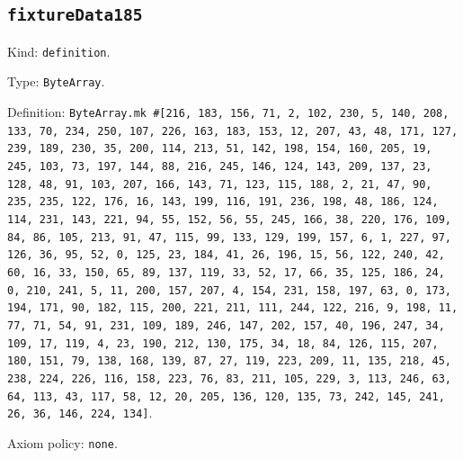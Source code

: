 \documentclass[11pt]{article}
\begin{document}
\subsection*{\texttt{fixtureData185}}
\noindent Kind: \texttt{definition}.\par
\noindent Type: \texttt{ByteArray}.\par
\noindent Definition: \texttt{ByteArray.mk \#[216, 183, 156, 71, 2, 102, 230, 5, 140, 208, 133, 70, 234, 250, 107, 226, 163, 183, 153, 12, 207, 43, 48, 171, 127, 239, 189, 230, 35, 200, 114, 213, 51, 142, 198, 154, 160, 205, 19, 245, 103, 73, 197, 144, 88, 216, 245, 146, 124, 143, 209, 137, 23, 128, 48, 91, 103, 207, 166, 143, 71, 123, 115, 188, 2, 21, 47, 90, 235, 235, 122, 176, 16, 143, 199, 116, 191, 236, 198, 48, 186, 124, 114, 231, 143, 221, 94, 55, 152, 56, 55, 245, 166, 38, 220, 176, 109, 84, 86, 105, 213, 91, 47, 115, 99, 133, 129, 199, 157, 6, 1, 227, 97, 126, 36, 95, 52, 0, 125, 23, 184, 41, 26, 196, 15, 56, 122, 240, 42, 60, 16, 33, 150, 65, 89, 137, 119, 33, 52, 17, 66, 35, 125, 186, 24, 0, 210, 241, 5, 11, 200, 157, 207, 4, 154, 231, 158, 197, 63, 0, 173, 194, 171, 90, 182, 115, 200, 221, 211, 111, 244, 122, 216, 9, 198, 11, 77, 71, 54, 91, 231, 109, 189, 246, 147, 202, 157, 40, 196, 247, 34, 109, 17, 119, 4, 23, 190, 212, 130, 175, 34, 18, 84, 126, 115, 207, 180, 151, 79, 138, 168, 139, 87, 27, 119, 223, 209, 11, 135, 218, 45, 238, 224, 226, 116, 158, 223, 76, 83, 211, 105, 229, 3, 113, 246, 63, 64, 113, 43, 117, 58, 12, 20, 205, 136, 120, 135, 73, 242, 145, 241, 26, 36, 146, 224, 134]}.\par
\noindent Axiom policy: \texttt{none}.\par
\end{document}
